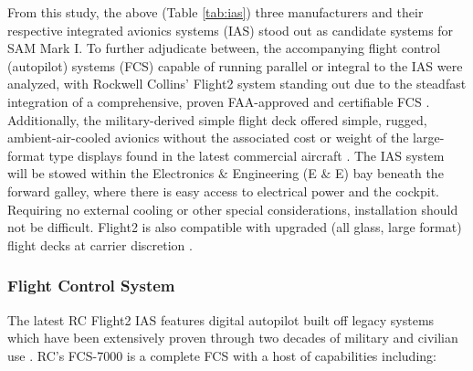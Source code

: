 From this study, the above (Table \ref{tab:ias}) three manufacturers and their respective integrated avionics systems (IAS) stood out as candidate systems for SAM Mark I.  To further adjudicate between, the accompanying flight control (autopilot) systems (FCS) capable of running parallel or integral to the IAS were analyzed, with Rockwell Collins' Flight2 system standing out due to the steadfast integration of a comprehensive, proven FAA-approved and certifiable FCS \cite{fcs7000pdf}.  Additionally, the military-derived simple flight deck \cite{flight2page} offered simple, rugged, ambient-air-cooled avionics \cite{flight2pdf} without the associated cost or weight of the large-format type displays found in the latest commercial aircraft \cite{flight2page}.  The IAS system will be stowed within the Electronics $\&$ Engineering (E $\&$ E) bay beneath the forward galley, where there is easy access to electrical power and the cockpit.  Requiring no external cooling or other special considerations, installation should not be difficult.  Flight2 is also compatible with upgraded (all glass, large format) flight decks at carrier discretion \cite{flight2page}. 


\subsubsection{Flight Control System}
The latest RC Flight2 IAS features digital autopilot built off legacy systems which have been extensively proven through two decades of military and civilian use \cite{flight2page}.  RC's FCS-7000 is a complete FCS with a host of capabilities \cite{fcs7000pdf} including:

